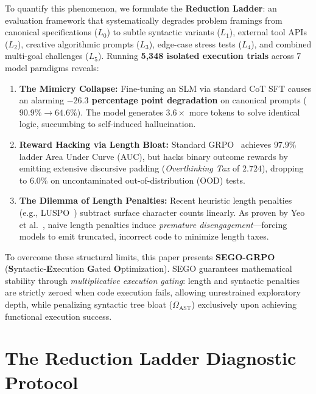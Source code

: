 \documentclass[10pt,twocolumn,letterpaper]{article}
\newcommand{\OmegaAST}{\Omega_{\text{AST}}}
\begin{document}
To quantify this phenomenon, we formulate the \textbf{Reduction Ladder}: an evaluation framework that systematically degrades problem framings from canonical specifications ($L_0$) to subtle syntactic variants ($L_1$), external tool APIs ($L_2$), creative algorithmic prompts ($L_3$), edge-case stress tests ($L_4$), and combined multi-goal challenges ($L_5$). Running \textbf{5,348 isolated execution trials} across 7 model paradigms reveals:
\begin{enumerate}[leftmargin=*]
    \item \textbf{The Mimicry Collapse:} Fine-tuning an SLM via standard CoT SFT causes an alarming \textbf{$-26.3$ percentage point degradation} on canonical prompts ($90.9\% \rightarrow 64.6\%$). The model generates $3.6\times$ more tokens to solve identical logic, succumbing to self-induced hallucination.
    \item \textbf{Reward Hacking via Length Bloat:} Standard GRPO~\cite{shao2024deepseekmath} achieves $97.9\%$ ladder Area Under Curve (AUC), but hacks binary outcome rewards by emitting extensive discursive padding (\textit{Overthinking Tax} of $2.724$), dropping to $6.0\%$ on uncontaminated out-of-distribution (OOD) tests.
    \item \textbf{The Dilemma of Length Penalties:} Recent heuristic length penalties (e.g., LUSPO~\cite{luspo2025}) subtract surface character counts linearly. As proven by Yeo et al.~\cite{yeo2025demystifying}, naive length penalties induce \textit{premature disengagement}---forcing models to emit truncated, incorrect code to minimize length taxes.
\end{enumerate}

To overcome these structural limits, this paper presents \textbf{SEGO-GRPO} (\textbf{S}yntactic-\textbf{E}xecution \textbf{G}ated \textbf{O}ptimization). SEGO guarantees mathematical stability through \textit{multiplicative execution gating}: length and syntactic penalties are strictly zeroed when code execution fails, allowing unrestrained exploratory depth, while penalizing syntactic tree bloat ($\OmegaAST$) exclusively upon achieving functional execution success.

\section{The Reduction Ladder Diagnostic Protocol}
\label{sec:ladder}
\end{document}
